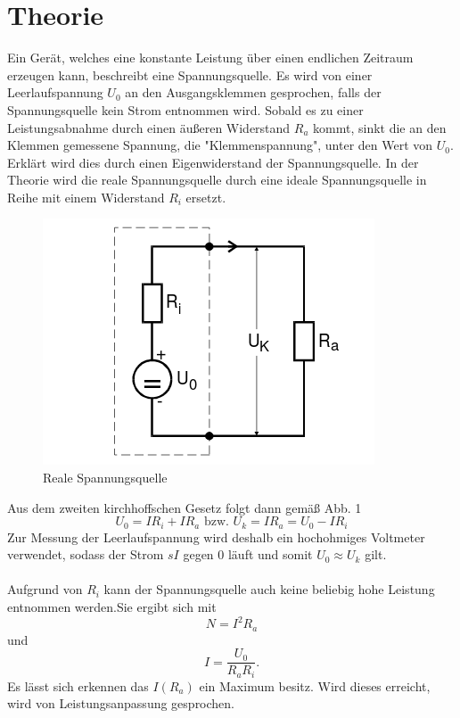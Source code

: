 \section{Theorie}
\label{sec:Theorie}

Ein Gerät, welches eine konstante Leistung über
einen endlichen Zeitraum erzeugen kann, beschreibt eine Spannungsquelle. Es wird von einer Leerlaufspannung $ U_0 $
an den Ausgangsklemmen gesprochen, falls der Spannungsquelle kein Strom entnommen wird.
Sobald es zu einer Leistungsabnahme durch einen äußeren Widerstand $ R_a $ kommt,
sinkt die an den Klemmen gemessene Spannung, die "Klemmenspannung", unter den Wert von $ U_0 $. Erklärt wird
dies durch einen Eigenwiderstand der Spannungsquelle. In der Theorie wird die reale
Spannungsquelle durch eine ideale Spannungsquelle in Reihe mit einem Widerstand $ R_i$
ersetzt.
\begin{figure}[H]
  \centering

  \includegraphics[width=\linewidth-200pt,height=\textheight-200pt,keepaspectratio]{content/Spannungsquelle1.png}
  \caption{Reale Spannungsquelle}
  \label{fig:Spannung1}
\end{figure}

Aus dem zweiten kirchhoffschen Gesetz folgt dann gemäß Abb. 1
\begin{equation}
	 U_0 = I R_i + I R_a  \text{ bzw. } U_k = I R_a = U_0-IR_i
\end{equation}
Zur Messung der Leerlaufspannung wird deshalb ein hochohmiges Voltmeter verwendet,
sodass der Strom $sI$ gegen $0$ läuft und somit $U_0 \approx U_k$ gilt.\\
\\
Aufgrund von $R_i$ kann der Spannungsquelle auch keine beliebig hohe Leistung
entnommen werden.Sie ergibt sich mit
\begin{equation}
  N = I^2 R_a
  \end{equation}
  und
\begin{equation}
   I =\frac{U_0}{R_a R_i}\text{.}
 \end{equation}
  Es lässt sich erkennen das $I(R_a)$
  ein Maximum besitz. Wird dieses erreicht, wird von Leistungsanpassung gesprochen.

